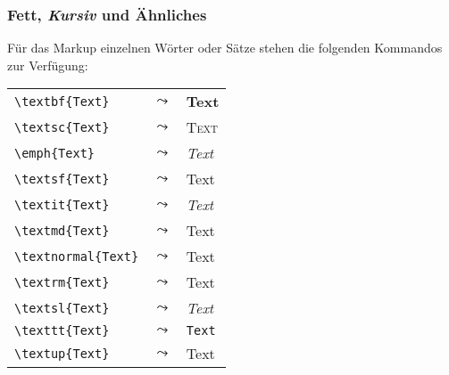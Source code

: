 \begin{frame}[fragile]
  \frametitle{\textbf{Fett}, \textit{Kursiv} und Ähnliches}

  \onslide<+->

  Für das Markup einzelnen Wörter oder Sätze stehen die folgenden Kommandos zur Verfügung:
  \bigskip

  \centering
  \begin{tabular}[c]{lcl}
    \lstinline!\textbf{Text}! & $\leadsto$ & \textbf{Text}\\
    \lstinline!\textsc{Text}! & $\leadsto$ & \textsc{Text}\\
    \lstinline!\emph{Text}!   & $\leadsto$ & \emph{Text}\\
    \lstinline!\textsf{Text}! & $\leadsto$ & \textsf{Text}\\
    \lstinline!\textit{Text}! & $\leadsto$ & \textit{Text}\\
    \lstinline!\textmd{Text}! & $\leadsto$ & \textmd{Text}\\
    \lstinline!\textnormal{Text}! & $\leadsto$ & \textnormal{Text}\\
    \lstinline!\textrm{Text}! & $\leadsto$ & \textrm{Text}\\
    \lstinline!\textsl{Text}! & $\leadsto$ & \textsl{Text}\\
    \lstinline!\texttt{Text}! & $\leadsto$ & \texttt{Text}\\
    \lstinline!\textup{Text}! & $\leadsto$ & \textup{Text}
  \end{tabular}

\end{frame}

